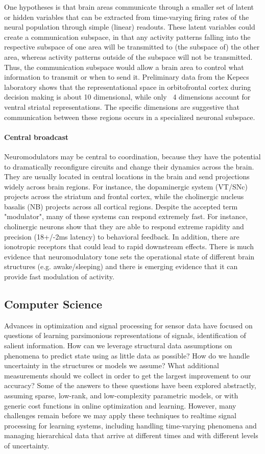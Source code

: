 \documentclass[12pt]{report}
\begin{document}
One hypotheses is that brain areas communicate through a smaller set of latent
or hidden variables that can be extracted from time-varying firing rates of
the neural population through simple (linear) readouts. These latent variables
could create a communication subspace, in that any activity patterns falling
into the respective subspace of one area will be transmitted to (the subspace
of) the other area, whereas activity patterns outside of the subspace will not
be transmitted. Thus, the communication subspace would allow a brain area to
control what information to transmit or when to send it. Preliminary data from
the Kepecs laboratory shows that the representational space in orbitofrontal
cortex during decision making is about 10 dimensional, while only ~4 dimensions
account for ventral striatal representations. The specific dimensions are
suggestive that communication between these regions occurs in a specialized
neuronal subspace.

\paragraph*{Central broadcast}
Neuromodulators may be central to coordination, because they have the potential
to dramatically reconfigure circuits and change their dynamics across the brain.
They are usually located in central locations in the brain and send projections
widely across brain regions. For instance, the dopaminergic system (VT/SNc)
projects across the striatum and frontal cortex, while the cholinergic nucleus
basalis (NB) projects across all cortical regions. Despite the accepted term
"modulator", many of these systems can respond extremely fast. For instance,
cholinergic neurons show that they are able to respond extreme rapidity and
precision (18+/-2ms latency) to behavioral feedback. In addition, there are
ionotropic receptors that could lead to rapid downstream effects. There is
much evidence that neuromodulatory tone sets the operational state of different
brain structures (e.g. awake/sleeping) and there is emerging evidence that it
can provide fast modulation of activity.

\subsection*{Computer Science}
Advances in optimization and signal processing for sensor data have focused on questions of learning parsimonious representations of signals, identification of salient information. How can we leverage structural data assumptions on phenomena to predict state using as little data as possible? How do we handle uncertainty in the structures or models we assume? What additional measurements should we collect in order to get the largest improvement to our accuracy? Some of the answers to these questions have been explored abstractly, assuming sparse, low-rank, and low-complexity parametric models, or with generic cost functions in online optimization and learning. However, many challenges remain before we may apply these techniques to realtime signal processing for learning systems, including handling time-varying phenomena and managing hierarchical data that arrive at different times and with different levels of uncertainty.
\end{document}

